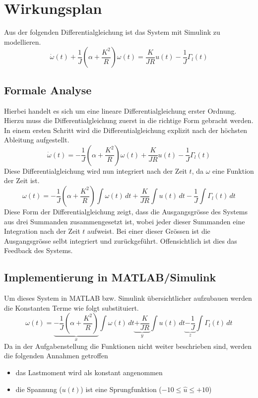 \section{Wirkungsplan}
Aus der folgenden Differentialgleichung ist das System mit Simulink zu
modellieren.
\[
	\dot{\omega}(t)
		+ \frac{1}{J} \left(\alpha + \frac{K^2}{R}\right) \omega(t)
	= \frac{K}{JR} u(t) - \frac{1}{J} \Gamma_l(t)
\]

\subsection{Formale Analyse}
Hierbei handelt es sich um eine lineare Differentialgleichung erster Ordnung.
Hierzu muss die Differentialgleichung zuerst in die richtige Form gebracht
werden. In einem ersten Schritt wird die Differentialgleichung explizit nach
der höchsten Ableitung aufgestellt.
\[
	\dot{\omega}(t)
	= - \frac{1}{J} \left(\alpha + \frac{K^2}{R} \right) \omega(t)
		+ \frac{K}{JR} u(t) - \frac{1}{J} \Gamma_l(t)	
\]
Diese Differentialgleichung wird nun integriert nach der Zeit $t$, da $\omega$
eine Funktion der Zeit ist.
\[
	\omega(t)
	= - \frac{1}{J} \left(\alpha + \frac{K^2}{R} \right) \int\omega(t)\,dt
		+ \frac{K}{JR} \int u(t)\,dt
		- \frac{1}{J} \int \Gamma_l(t)\,dt
\]
Diese Form der Differentialgleichung zeigt, dass die Ausgangsgrösse des
Systems aus drei Summanden zusammengesetzt ist, wobei jeder dieser Summanden
eine Integration nach der Zeit $t$ aufweist. Bei einer dieser Grössen ist
die Ausgangsgrösse selbt integriert und zurückgeführt. Offensichtlich ist dies
das Feedback des Systems.

\subsection{Implementierung in MATLAB/Simulink}
Um dieses System in MATLAB bzw. Simulink übersichtlicher aufzubauen werden
die Konstanten Terme wie folgt substituiert.
\[
	\omega(t)
	= \underbrace{- \frac{1}{J} \left(\alpha + \frac{K^2}{R} \right)}_{x}
		\int\omega(t)\,dt
		\underbrace{+ \frac{K}{JR}}_{y} \int u(t)\,dt
		\underbrace{- \frac{1}{J}}_{z} \int \Gamma_l(t)\,dt
\]
Da in der Aufgabenstellung die Funktionen nicht weiter beschrieben sind,
werden die folgenden Annahmen getroffen
\begin{itemize}
	\item das Lastmoment wird als konstant angenommen
	\item die Spannung ($u(t)$) ist eine Sprungfunktion
		($-10 \leq \hat{u} \leq +10$)
\end{itemize}

